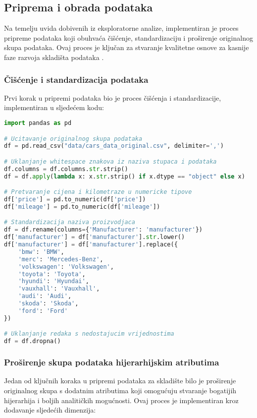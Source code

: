 \subsection{Priprema i obrada podataka}

Na temelju uvida dobivenih iz eksploratorne analize, implementiran je proces pripreme podataka koji obuhvaća čišćenje, standardizaciju i proširenje originalnog skupa podataka. Ovaj proces je ključan za stvaranje kvalitetne osnove za kasnije faze razvoja skladišta podataka \cite{Wu2009}.

\subsubsection{Čišćenje i standardizacija podataka}

Prvi korak u pripremi podataka bio je proces čišćenja i standardizacije, implementiran u sljedećem kodu:

\begin{lstlisting}[language=Python, caption={Čišćenje i standardizacija podataka}]
import pandas as pd

# Ucitavanje originalnog skupa podataka
df = pd.read_csv("data/cars_data_original.csv", delimiter=',')

# Uklanjanje whitespace znakova iz naziva stupaca i podataka
df.columns = df.columns.str.strip()
df = df.apply(lambda x: x.str.strip() if x.dtype == "object" else x)

# Pretvaranje cijena i kilometraze u numericke tipove
df['price'] = pd.to_numeric(df['price'])
df['mileage'] = pd.to_numeric(df['mileage'])

# Standardizacija naziva proizvodjaca
df = df.rename(columns={'Manufacturer': 'manufacturer'})
df['manufacturer'] = df['manufacturer'].str.lower()
df['manufacturer'] = df['manufacturer'].replace({
    'bmw': 'BMW',
    'merc': 'Mercedes-Benz', 
    'volkswagen': 'Volkswagen',
    'toyota': 'Toyota',
    'hyundi': 'Hyundai',
    'vauxhall': 'Vauxhall',
    'audi': 'Audi',
    'skoda': 'Skoda',
    'ford': 'Ford'
})

# Uklanjanje redaka s nedostajucim vrijednostima
df = df.dropna()
\end{lstlisting}

\subsubsection{Proširenje skupa podataka hijerarhijskim atributima}

Jedan od ključnih koraka u pripremi podataka za skladište bilo je proširenje originalnog skupa s dodatnim atributima koji omogućuju stvaranje bogatijih hijerarhija i boljih analitičkih mogućnosti. Ovaj proces je implementiran kroz dodavanje sljedećih dimenzija:

